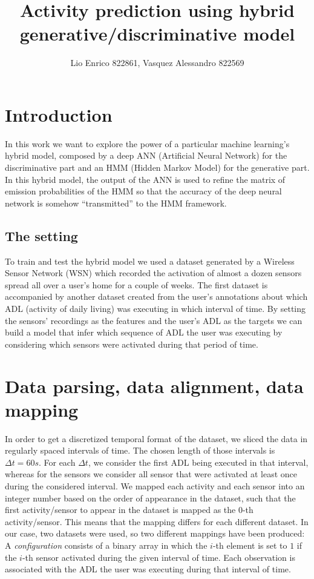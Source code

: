 \documentclass[10pt,a4paper]{article}
\title{Activity prediction using hybrid generative/discriminative model}
\author{Lio Enrico 822861, Vasquez Alessandro 822569}
\begin{document}
\maketitle
\newpage
\section{Introduction}
In this work we want to explore the power of a particular machine learning's hybrid model, composed by a deep ANN (Artificial Neural Network) for the discriminative part and an HMM (Hidden Markov Model) for the generative part. In this hybrid model, the output of the ANN is used to refine the matrix of emission probabilities of the HMM so that the accuracy of the deep neural network is somehow ``transmitted'' to the HMM framework.
\subsection{The setting}
To train and test the hybrid model we used a dataset generated by a Wireless Sensor Network (WSN) which recorded the activation of almost a dozen sensors spread all over a user's home for a couple of weeks. The first dataset is accompanied by another dataset created from the user's annotations about which ADL (activity of daily living) was executing in which interval of time. By setting the sensors' recordings as the features and the user's ADL as the targets we can build a model that infer which sequence of ADL the user was executing by considering which sensors were activated during that period of time. 

\section{Data parsing, data alignment, data mapping}
In order to get a discretized temporal format of the dataset, we sliced the data in regularly spaced intervals of time. The chosen length of those intervals is $\Delta t=60s$.
For each $\Delta t$, we consider the first ADL being executed in that interval, whereas for the sensors we consider all sensor that were activated at least once during the considered interval.
We mapped each activity and each sensor into an integer number based on the order of appearance in the dataset, such that the first activity/sensor to appear in the dataset is mapped as the $0$-th activity/sensor. This means that the mapping differs for each different dataset. In our case, two datasets were used, so two different mappings have been produced: 
 A \textit{configuration} consists of a binary array in which the $i$-th element is set to $1$ if the $i$-th sensor activated during the given interval of time. Each observation is associated with the ADL the user was executing during that interval of time. 
 
\end{document}
